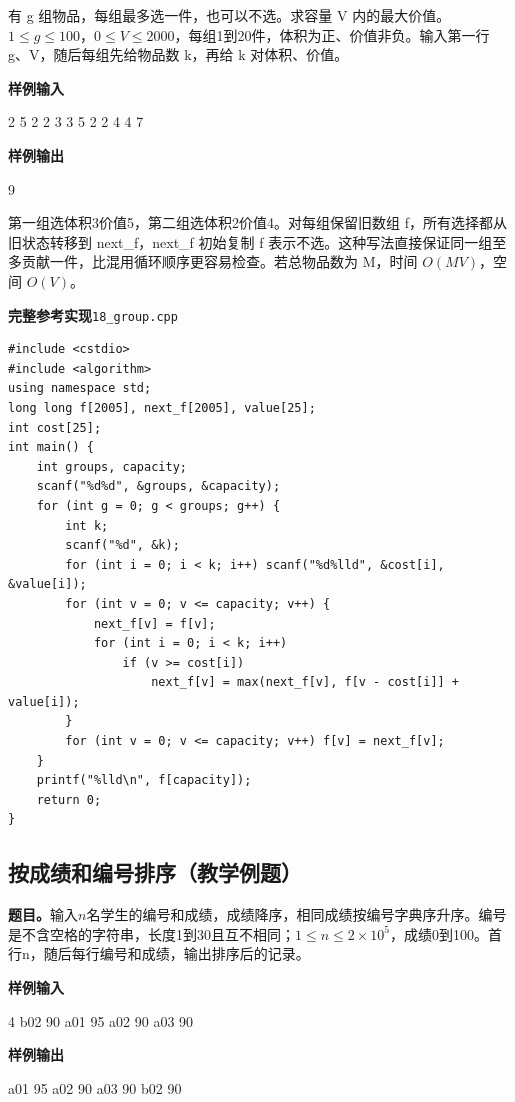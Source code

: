 \documentclass[UTF8,11pt,a4paper,fontset=none]{ctexart}
\begin{document}
有 g 组物品，每组最多选一件，也可以不选。求容量 V 内的最大价值。$1\le g\le100$，$0\le V\le2000$，每组1到20件，体积为正、价值非负。输入第一行 g、V，随后每组先给物品数 k，再给 k 对体积、价值。
\begin{tcolorbox}[samplebox,title={输入输出样例}]
\textbf{样例输入}
\begin{Sample}
2 5
2
2 3
3 5
2
2 4
4 7
\end{Sample}
\tcblower
\textbf{样例输出}
\begin{Sample}
9
\end{Sample}
\end{tcolorbox}
第一组选体积3价值5，第二组选体积2价值4。对每组保留旧数组 f，所有选择都从旧状态转移到 next\_f，next\_f 初始复制 f 表示不选。这种写法直接保证同一组至多贡献一件，比混用循环顺序更容易检查。若总物品数为 M，时间 $O(MV)$，空间 $O(V)$。
\par\noindent\begin{minipage}{\linewidth}
\textbf{完整参考实现}\quad\texttt{18\_group.cpp}
\begin{lstlisting}
#include <cstdio>
#include <algorithm>
using namespace std;
long long f[2005], next_f[2005], value[25];
int cost[25];
int main() {
    int groups, capacity;
    scanf("%d%d", &groups, &capacity);
    for (int g = 0; g < groups; g++) {
        int k;
        scanf("%d", &k);
        for (int i = 0; i < k; i++) scanf("%d%lld", &cost[i], &value[i]);
        for (int v = 0; v <= capacity; v++) {
            next_f[v] = f[v];
            for (int i = 0; i < k; i++)
                if (v >= cost[i])
                    next_f[v] = max(next_f[v], f[v - cost[i]] + value[i]);
        }
        for (int v = 0; v <= capacity; v++) f[v] = next_f[v];
    }
    printf("%lld\n", f[capacity]);
    return 0;
}
\end{lstlisting}
\end{minipage}\par

\subsection{按成绩和编号排序（教学例题）}

\noindent\textbf{题目。}输入$n$名学生的编号和成绩，成绩降序，相同成绩按编号字典序升序。编号是不含空格的字符串，长度1到30且互不相同；$1\le n\le2\times10^5$，成绩0到100。首行n，随后每行编号和成绩，输出排序后的记录。
\begin{tcolorbox}[samplebox,title={输入输出样例}]
\textbf{样例输入}
\begin{Sample}
4
b02 90
a01 95
a02 90
a03 90
\end{Sample}
\tcblower
\textbf{样例输出}
\begin{Sample}
a01 95
a02 90
a03 90
b02 90
\end{Sample}
\end{tcolorbox}
\end{document}
